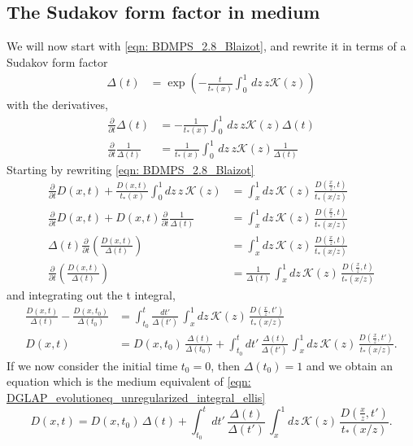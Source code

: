 \documentclass[main.tex]{subfiles}
\begin{document}
\subsection{The Sudakov form factor in medium}\label{sec: medium_sudakov}
We will now start with \autoref{eqn: BDMPS_2.8_Blaizot}, and rewrite it in terms of a Sudakov form factor
\begin{align}\label{eqn: BDMPS_sudakov}
    \Delta (t) &= \exp \left( -\frac{t}{t_*(x)} \int_0^1 \, dz\, z \mathcal{K}(z) \right)
\end{align}
with the derivatives, 
\begin{align}
    \frac{\partial}{\partial t} \Delta (t) &= - \frac{1}{t_*(x)} \int_0^1 \, dz\, z \mathcal{K}(z)  \Delta(t) \nonumber\\
    \frac{\partial}{\partial t} \frac{1}{\Delta (t)} &= \frac{1}{t_*(x)} \int_0^1 \, dz\, z \mathcal{K}(z)  \frac{1}{\Delta(t) }
\end{align}
Starting by rewriting \autoref{eqn: BDMPS_2.8_Blaizot}
\begin{align}
    \frac{\partial}{\partial t} D(x,t) + \frac{D\left(x,t\right)}{t_*(x)} \int_0^1 dz\, z\, \mathcal{K}(z) &= \int_x^1 dz\, \mathcal{K}(z)\, \frac{D\left(\frac{x}{z}, t\right)}{t_*(x/z)} \nonumber\\
    \frac{\partial}{\partial t} D(x,t) + D(x,t) \frac{\partial}{\partial t} \frac{1}{\Delta(t)} &= \int_x^1 dz\, \mathcal{K}(z)\, \frac{D\left(\frac{x}{z}, t\right)}{t_*(x/z)} \nonumber\\
    \Delta(t) \frac{\partial}{\partial t} \left( \frac{D(x,t)}{\Delta(t)} \right) &= \int_x^1 dz\, \mathcal{K}(z)\, \frac{D\left(\frac{x}{z}, t\right)}{t_*(x/z)} \nonumber\\
    \frac{\partial}{\partial t} \left( \frac{D(x,t)}{\Delta(t)} \right) &= \frac{1}{\Delta(t)} \, \int_x^1 dz\, \mathcal{K}(z)\, \frac{D\left(\frac{x}{z}, t\right)}{t_*(x/z)} 
\end{align}
and integrating out the t integral, 
\begin{align}
    \frac{D(x,t)}{\Delta(t)} - \frac{D(x,t_0)}{\Delta(t_0)} &= \int_{t_0}^t \frac{dt'}{\Delta(t')} \, \int_x^1 dz\, \mathcal{K}(z)\, \frac{D\left(\frac{x}{z}, t'\right)}{t_*(x/z)} \nonumber\\
    D(x,t) &= D(x,t_0)\, \frac{\Delta(t)}{\Delta(t_0)} + \int_{t_0}^t dt' \, \frac{\Delta(t)}{\Delta(t')} \, \int_x^1 dz\, \mathcal{K}(z)\, \frac{D\left(\frac{x}{z}, t'\right)}{t_*(x/z)}.
\end{align}
If we now consider the initial time \(t_0 = 0\), then \(\Delta(t_0) = 1\) and we obtain an equation which is the medium equivalent of \autoref{eqn: DGLAP_evolutioneq_unregularized_integral_ellis}
\begin{equation}
    D(x,t) = D(x,t_0)\, \Delta(t) + \int_{t_0}^t dt' \, \frac{\Delta(t)}{\Delta(t')} \, \int_x^1 dz\, \mathcal{K}(z)\, \frac{D\left(\frac{x}{z}, t'\right)}{t_*(x/z)}.
\end{equation}
\end{document}
